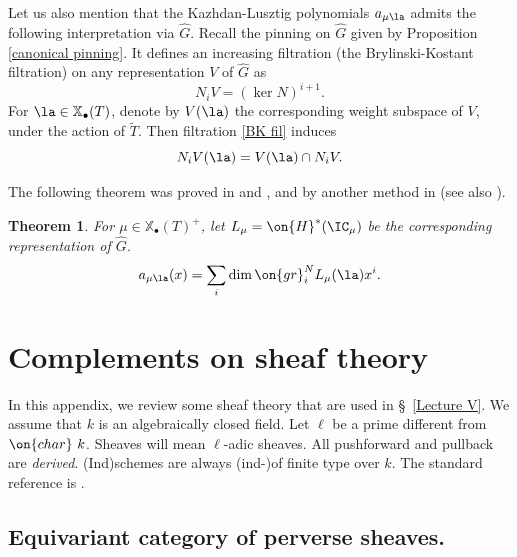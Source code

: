 \documentclass[]{pcmi}
\theoremstyle{plain}
\newtheorem{thm}[equation]{Theorem}
\theoremstyle{remark}
\theoremstyle{definition}
\newcommand{\cha}{{\on{char}}}
\def\xcoch{\mathbb{X}_\bullet}
\begin{document}
Let us also mention that the Kazhdan-Lusztig polynomials $a_{\mu\la}$ admits the following interpretation via $\hat G$.
Recall the pinning on $\hat G$ given by Proposition \ref{canonical pinning}. It defines an increasing filtration (the
Brylinski-Kostant filtration) on any representation $V$ of $\hat G$ as
\begin{equation}\label{BK fil}
N_iV=(\ker N)^{i+1}.
\end{equation}
For $\la\in\xcoch(T)$, denote by $V(\la)$ the corresponding weight subspace of $V$, under the action of
$\tilde T$. Then filtration \eqref{BK fil} induces
\begin{equation}\label{BKfilmu}
N_iV(\la)=V(\la)\cap N_iV.
\end{equation}

The following theorem was proved in \cite{Lu} and \cite{Bry}, and by another method in \cite[\S~5]{Gi1} (see also \cite[\S~5]{Z11}). 
\begin{thm}For $\mu\in\xcoch(T)^+$, let $L_\mu=\on{H}^*(\IC_\mu)$ be the corresponding representation of $\hat G$.
\[a_{\mu\la}(x)=\sum_i \dim \on{gr}^N_iL_\mu(\la)x^i.\]
\end{thm}

\appendix

\section{Complements on sheaf theory}\label{App}
In this appendix, we review some sheaf theory that are used in \S~\ref{Lecture V}. We assume that $k$ is an algebraically closed field. Let $\ell$ be a prime different from $\cha\ k$. Sheaves will mean $\ell$-adic sheaves. All pushforward and pullback are \emph{derived}. (Ind)schemes are always (ind-)of finite type over $k$. The standard reference is \cite{BBD}.



\subsection{Equivariant category of perverse sheaves.}
\end{document}
